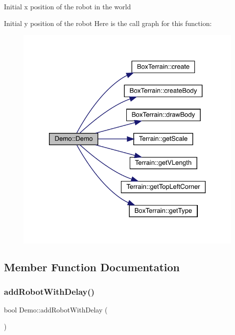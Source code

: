 Initial x position of the robot in the world

Initial y position of the robot Here is the call graph for this function\+:\nopagebreak
\begin{figure}[H]
\begin{center}
\leavevmode
\includegraphics[width=320pt]{class_demo_a7fa722430ba973c538ae230e407854ab_cgraph}
\end{center}
\end{figure}


\subsection{Member Function Documentation}
\mbox{\label{class_demo_a4636f708574c6be85334ff16373e2292}} 
\subsubsection{\texorpdfstring{add\+Robot\+With\+Delay()}{addRobotWithDelay()}}
{\footnotesize\ttfamily bool Demo\+::add\+Robot\+With\+Delay (\begin{DoxyParamCaption}{ }\end{DoxyParamCaption})}

